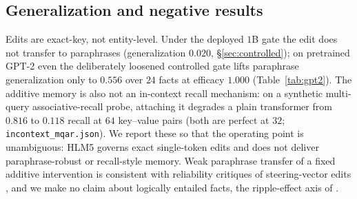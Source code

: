 \documentclass[10pt,twocolumn]{article}
\theoremstyle{remark}
\begin{document}
\begin{table}[t]
\centering
\small
{}
\caption{Synthetic injection-vs-$K$ on a toy LM (single \texttt{TransformerEncoderLayer}),
\emph{not} the $1$B trunk. At $D{=}64$ a collateral wall appears at $K{=}96$
(others-intact $0.000$); at $D{=}256$ adequate edit strength is required for
efficacy. Data: \texttt{lm\_kb\_inject.json} ($D{=}64$),
\texttt{lm\_kb\_inject\_d256.json} ($D{=}256$, $\beta{=}25$),
\texttt{lm\_kb\_inject\_d256\_b70.json} ($D{=}256$, $\beta{=}70$);
$\beta{=}25$ is the producing script's default, recorded in the script, not the JSON.}
\label{tab:ksweep}
\end{table}

\subsection{Generalization and negative results}
\label{sec:gen}

Edits are exact-key, not entity-level. Under the deployed $1$B gate the edit does
not transfer to paraphrases (generalization $0.020$, \S\ref{sec:controlled}); on
pretrained GPT-2 even the deliberately loosened controlled gate lifts paraphrase
generalization only to $0.556$ over $24$ facts at efficacy $1.000$
(Table~\ref{tab:gpt2}). The additive memory is also not an in-context recall
mechanism: on a synthetic multi-query associative-recall probe, attaching it
degrades a plain transformer from $0.816$ to $0.118$ recall at $64$ key--value
pairs (both are perfect at $32$; \texttt{incontext\_mqar.json}). We report these so that the operating point is
unambiguous: HLM5 governs exact single-token edits and does not deliver
paraphrase-robust or recall-style memory. Weak paraphrase transfer of a fixed
additive intervention is consistent with reliability critiques of steering-vector
edits \citep{tan2024steering}, and we make no claim about logically entailed
facts, the ripple-effect axis of \citet{cohen2024ripple}.
\end{document}
